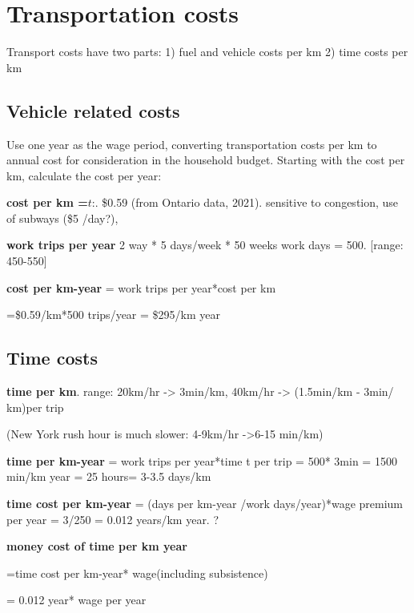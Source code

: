     
 

\section{Transportation costs}
Transport costs have two parts:
1) fuel and vehicle costs per km
2) time costs per km

\subsection{Vehicle related costs}
Use one year as the wage period, converting transportation costs per km to annual cost for consideration in the household budget. Starting with the cost per km, calculate the cost per year:

\textbf{cost per km =$\textit{t}$}:. \$0.59   (from  Ontario data, 2021). sensitive to congestion, use of subways (\$5 /day?), 

 \textbf{work trips per year} 2 way * 5 days/week * 50 weeks work days = 500. [range: 450-550]

\textbf{cost per km-year} = work trips per year*cost per km

=\$0.59/km*500 trips/year  =  \$295/km year 



\subsection{Time costs}
\textbf{time per km}. range: 20km/hr -> 3min/km, 40km/hr -> (1.5min/km - 3min/ km)per trip 

(New York rush hour is much slower:  4-9km/hr ->6-15 min/km)

\textbf{time  per km-year} = work trips per year*time t per trip = 500* 3min  = 1500 min/km year = 25 hours= 3-3.5 days/km
 
\textbf{time cost per km-year} =  (days per km-year /work days/year)*wage premium per year  = 3/250 = 0.012 years/km year. ?

\textbf{money cost of time per km year} 

=time cost per km-year* wage(including subsistence) 

= 0.012 year* wage per year

